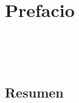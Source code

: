 \chapter*{Prefacio}



\begin{center}
{\LARGE\bfseries\titulo}\\
\end{center}
\begin{center}
\autor\
\end{center}

\section*{Resumen}

